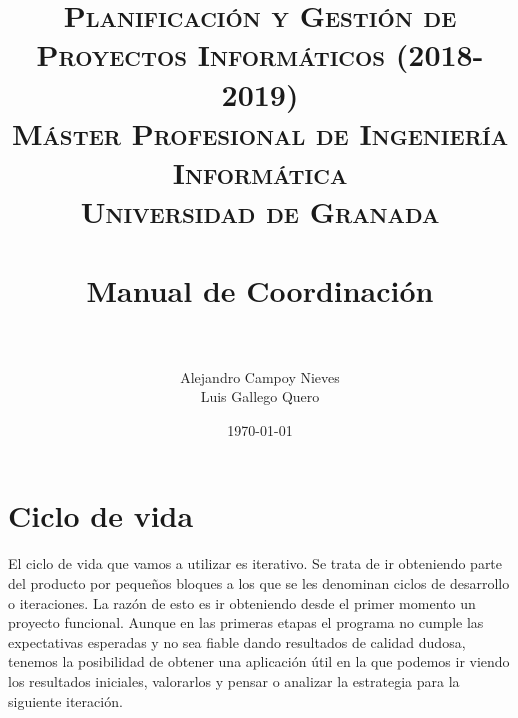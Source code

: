 


\title{	
	\normalfont \normalsize 
	\textsc{\textbf{Planificación y Gestión de Proyectos Informáticos (2018-2019)} \\ Máster Profesional de Ingeniería Informática \\ Universidad de Granada} \\ [25pt] %
	\horrule{0.5pt} \\[0.4cm] %
	\huge Manual de Coordinación \\ %
	\horrule{2pt} \\[0.5cm] %
}

\author{Alejandro Campoy Nieves \\ Luis Gallego Quero} %
\date{\normalsize\today} %
\usepackage{graphicx}
\usepackage{hyperref} %




\maketitle %

\newpage %

\tableofcontents %



\newpage		
 
\section{Ciclo de vida}

El ciclo de vida que vamos a utilizar es iterativo. Se trata de ir obteniendo parte del producto por pequeños bloques a los que se les denominan ciclos de desarrollo o iteraciones. La razón de esto es ir obteniendo desde el primer momento un proyecto funcional. Aunque en las primeras etapas el programa no cumple las expectativas esperadas y no sea fiable dando resultados de calidad dudosa, tenemos la posibilidad de obtener una aplicación útil en la que podemos ir viendo los resultados iniciales, valorarlos y pensar o analizar la estrategia para la siguiente iteración. \\

